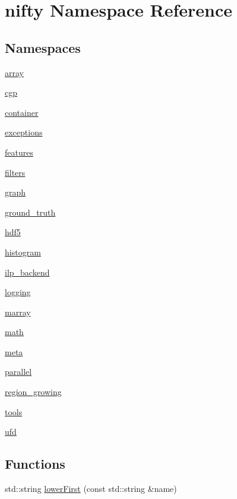 \hypertarget{namespacenifty}{}\section{nifty Namespace Reference}
\label{namespacenifty}
\subsection*{Namespaces}
\begin{DoxyCompactItemize}
\item 
 \hyperlink{namespacenifty_1_1array}{array}
\item 
 \hyperlink{namespacenifty_1_1cgp}{cgp}
\item 
 \hyperlink{namespacenifty_1_1container}{container}
\item 
 \hyperlink{namespacenifty_1_1exceptions}{exceptions}
\item 
 \hyperlink{namespacenifty_1_1features}{features}
\item 
 \hyperlink{namespacenifty_1_1filters}{filters}
\item 
 \hyperlink{namespacenifty_1_1graph}{graph}
\item 
 \hyperlink{namespacenifty_1_1ground__truth}{ground\+\_\+truth}
\item 
 \hyperlink{namespacenifty_1_1hdf5}{hdf5}
\item 
 \hyperlink{namespacenifty_1_1histogram}{histogram}
\item 
 \hyperlink{namespacenifty_1_1ilp__backend}{ilp\+\_\+backend}
\item 
 \hyperlink{namespacenifty_1_1logging}{logging}
\item 
 \hyperlink{namespacenifty_1_1marray}{marray}
\item 
 \hyperlink{namespacenifty_1_1math}{math}
\item 
 \hyperlink{namespacenifty_1_1meta}{meta}
\item 
 \hyperlink{namespacenifty_1_1parallel}{parallel}
\item 
 \hyperlink{namespacenifty_1_1region__growing}{region\+\_\+growing}
\item 
 \hyperlink{namespacenifty_1_1tools}{tools}
\item 
 \hyperlink{namespacenifty_1_1ufd}{ufd}
\end{DoxyCompactItemize}
\subsection*{Functions}
\begin{DoxyCompactItemize}
\item 
std\+::string \hyperlink{namespacenifty_af89b6a59b4fc8d4224d6a73f745d52f9}{lower\+First} (const std\+::string \&name)
\end{DoxyCompactItemize}


